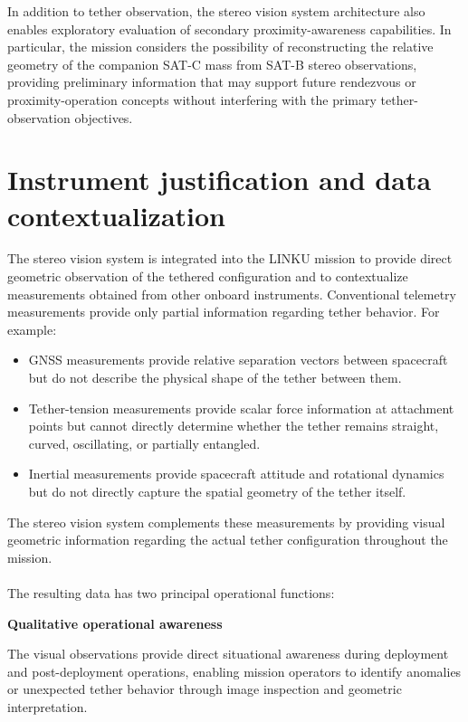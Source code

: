 In addition to tether observation, the stereo vision system architecture also enables exploratory evaluation of secondary proximity-awareness capabilities. In particular, the mission considers the possibility of reconstructing the relative geometry of the companion SAT-C mass from SAT-B stereo observations, providing preliminary information that may support future rendezvous or proximity-operation concepts without interfering with the primary tether-observation objectives.

\section{Instrument justification and data contextualization}

The stereo vision system is integrated into the LINKU mission to provide direct geometric observation of the tethered configuration and to contextualize measurements obtained from other onboard instruments. Conventional telemetry measurements provide only partial information regarding tether behavior. For example:

\begin{itemize}
    \item GNSS measurements provide relative separation vectors between spacecraft but do not describe the physical shape of the tether between them.
   \item Tether-tension measurements provide scalar force information at attachment points but cannot directly determine whether the tether remains straight, curved, oscillating, or partially entangled.
   \item Inertial measurements provide spacecraft attitude and rotational dynamics but do not directly capture the spatial geometry of the tether itself.
\end{itemize}

The stereo vision system complements these measurements by providing visual geometric information regarding the actual tether configuration throughout the mission.
\\\\
The resulting data has two principal operational functions:

\vspace{0.5cm}
\noindent \textbf{Qualitative operational awareness}
\vspace{0.2cm}

The visual observations provide direct situational awareness during deployment and post-deployment operations, enabling mission operators to identify anomalies or unexpected tether behavior through image inspection and geometric interpretation.

